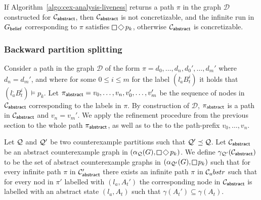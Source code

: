 \begin{theorem}
If Algorithm~\ref{algo:cex-analysis-liveness} returns a path $\pi$ in the graph $\mathcal D$ constructed for $\mathcal{C}_{\mathsf{abstract}}$, then $\mathcal{C}_{\mathsf{abstract}}$ is not concretizable, and the infinite run in $G_{\mathsf{belief}}$ corresponding to $\pi$ satisfies $\LTLglobally\LTLfinally p_k$, otherwise  $\mathcal{C}_{\mathsf{abstract}}$ is concretizable.
\end{theorem}

\subsubsection{Backward partition splitting}

Consider a path in the graph $\mathcal{D}$ of the form $\pi = d_0,\ldots, d_n,d_0',\ldots,d_m'$ where $d_n = d_m'$, and where for some $0 \leq i \leq m$ for the label $(l_a^,B_t^i)$ it holds that $(l_a^,B_t^i) \models p_k$. Let 
$\pi_{\mathsf{abstract}} = v_0,\ldots, v_n,v_0',\ldots,v_m'$ be the sequence of nodes in $\mathcal{C}_{\mathsf{abstract}}$ corresponding to the labels in $\pi$. By construction of $\mathcal D$, $\pi_{\mathsf{abstract}}$ is a path in $\mathcal{C}_{\mathsf{abstract}}$ and $v_n = v_m'$. We apply the refinement procedure from the previous section to the whole path $\pi_{\mathsf{abstract}}$, as well as to the to the path-prefix $v_0,\ldots, v_n$.

Let $\mathcal{Q}$ and $\mathcal{Q}'$ be two counterexample partitions such that $\mathcal{Q}' \preceq \mathcal{Q}$. Let $\mathcal{C}_{\mathsf{abstract}}$ be an abstract counterexample graph in $(\alpha_\part(G),\LTLglobally\LTLfinally p_k)$. We define $\gamma_{\mathcal{Q}'}(\mathcal{C}_{\mathsf{abstract}})$ to be the set of abstract counterexample graphs in $(\alpha_{\part'}(G),\LTLglobally p_k)$ such that for every infinite path $\pi$ in $\mathcal{C}_{\mathsf{abstract}}'$ there exists an infinite path $\pi$ in $\mathcal{C}_abstr$ such that for every nod in $\pi'$ labelled with $(l_a,A_t')$ the corresponding node in $\mathcal{C}_{\mathsf{abstract}}$ is labelled with an abstract state $(l_a,A_t)$ such that $\gamma(A_t') \subseteq \gamma(A_t)$.

